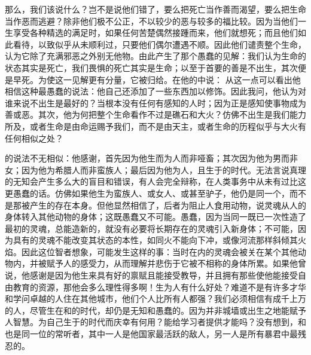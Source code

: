 那么，我们该说什么？岂不是说他们错了，要么把死亡当作善而渴望，要么把生命当作恶而逃避？除非他们极不公正，不以较少的恶与较多的福比较。因为当他们一生享受各种精选的满足时，如果任何苦楚偶然接踵而来，他们就想死；而且他们如此看待，以致似乎从未顺利过，只要他们偶尔遭遇不顺。因此他们谴责整个生命，认为它除了充满邪恶之外别无他物。由此产生了那个愚蠢的见解：我们认为生命的状态其实是死亡，我们畏惧的死亡其实是生命；以至于首要的善是不出生，其次便是早死。为使这一见解更有分量，它被归给。在他的中说： 从这一点可以看出他相信这种最愚蠢的说法：他自己还添加了一些东西加以修饰。因此我问，他认为对谁来说不出生是最好的？当根本没有任何有感知的人时；因为正是感知使事物成为善或恶。其次，他为何把整个生命看作不过是礁石和大火？仿佛不出生是我们能力所及，或者生命是由命运赐予我们，而不是由天主，或者生命的历程似乎与大火有任何相似之处？\par

的说法不无相似：他感谢，首先因为他生而为人而非哑畜；其次因为他为男而非女；因为他为希腊人而非蛮族人；最后因为他为人，且生于的时代。无法言说真理的无知会产生多么大的盲目和错误，有人会完全辩称，在人类事务中从未有过比这更愚蠢的话。仿佛如果他生为蛮族人、或女人、或甚至驴子，他仍是同一个，而不是那被产生的存在本身。但他显然相信了，后者为阻止人食用动物，说灵魂从人的身体转入其他动物的身体；这既愚蠢又不可能。愚蠢，因为当同一既已一次性造了最初的灵魂，总能造新的，就没有必要将长期存在的灵魂引入新身体；不可能，因为具有的灵魂不能改变其状态的本性，如同火不能向下冲，或像河流那样斜倾其火焰。因此这位智者想象，可能发生这样的事：当时在内的灵魂会被关在某个其他动物内，并被赋予人的感受力，从而理解并悲伤于它被不相称的身体所累。如果他曾说，他感谢是因为他生来具有好的禀赋且能接受教导，并且拥有那些使他能接受自由教育的资源，那他会多么理性得多啊！生为人有什么好处？难道不是有许多才华和学问卓越的人住在其他城市，他们个人比所有人都强？我们必须相信有成千上万的人，尽管生在和的时代，却仍是无知和愚蠢的。因为并非城墙或出生之地能赋予人智慧。为自己生于的时代而庆幸有何用？能给学习者提供才能吗？没有想到，和也是同一位的常听者，其中一人是他国家最活跃的敌人，另一人是所有暴君中最残忍的。\par

